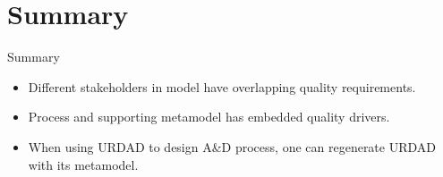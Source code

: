\documentclass[xcolor=svgnames]{beamer}
\begin{document}
\section{Summary}

\begin{frame}{Summary}
 \begin{itemize}
  \item<+-| alert@+> Different stakeholders in model have overlapping quality requirements.
  \item<+-| alert@+> Process and supporting metamodel has embedded quality drivers.
  \item<+-| alert@+> When using URDAD to design A\&D process, one can regenerate URDAD with its metamodel.
 \end{itemize}
\end{frame}
\end{document}
